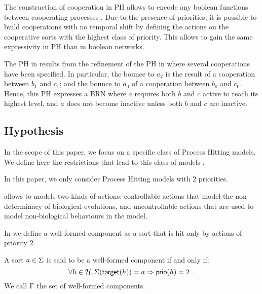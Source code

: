 The construction of cooperation in PH allows to encode any boolean functions between cooperating processes \cite{PMR10-TCSB}.
Due to the presence of priorities, it is possible to build cooperations with no temporal shift by defining the actions on the cooperative sorts with the highest class of priority.
This allows to gain the same expressivity in PH than in boolean networks.

\begin{example}
The PH in  results from the refinement of the PH in 
where several cooperations have been specified.
In particular, the bounce to $a_2$ is the result of a cooperation between $b_1$ and $c_1$; and the
bounce to $a_0$ of a cooperation between $b_0$ and $c_0$.
Hence, this PH expresses a BRN where $a$ requires both $b$ and $c$ active to reach its
highest level, and $a$ does not become inactive unless both $b$ and $c$ are inactive.
\end{example}

\subsection{Hypothesis} 
\label{ssec:hypothesis}

In the scope of this paper, we focus on a specific class of Process Hitting models.
We define here the restrictions that lead to this class of models .

\begin{criterion}[2 priorities]
\label{cr:2prio}
  In this paper, we only consider Process Hitting models with 2 priorities.
\end{criterion}

 allows to models two kinds of actions: controllable actions that model the non-determinacy of biological evolutions,
and uncontrollable actions that are used to model non-biological behaviours in the model.

In  we define a well-formed component as a sort that is hit only by actions of priority $2$.
\begin{definition}
\label{def:component}
  A sort $a \in \Sigma$ is said to be a well-formed component if and only if:
  $$\forall h \in \mathcal{H}, \Sigma(\mathsf{target}(h)) = a \Rightarrow \mathsf{prio}(h) = 2 \enspace.$$
  We call $\Gamma$ the set of well-formed components.
\end{definition}

